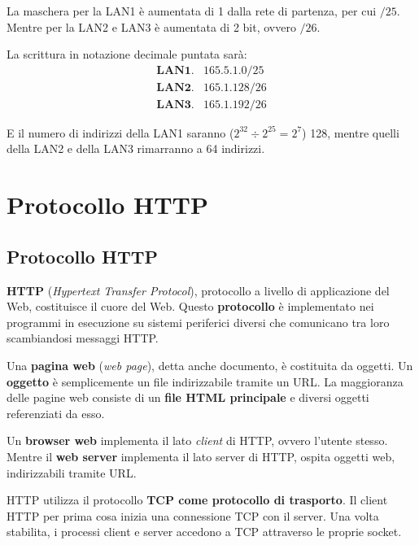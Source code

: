 \documentclass[a4paper]{article}
\begin{document}
	\noindent
	La maschera per la LAN1 è aumentata di 1 dalla rete di partenza, per cui $/25$. Mentre per la LAN2 e LAN3 è aumentata di 2 bit, ovvero $/26$.\newline
	
	\noindent
	La scrittura in notazione decimale puntata sarà:
	\begin{equation*}
		\begin{array}{ll}
			\textbf{LAN1.} & 165.5.1.0/25 \\
			\textbf{LAN2.} & 165.1.128/26 \\
			\textbf{LAN3.} & 165.1.192/26
		\end{array}
	\end{equation*}

	\noindent
	E il numero di indirizzi della LAN1 saranno ($2^{32} \div 2^{25} = 2^{7}$) 128, mentre quelli della LAN2 e della LAN3 rimarranno a 64 indirizzi.
	
	\newpage
	
	\section{Protocollo HTTP}
	
	\subsection{Protocollo HTTP}
	
	\textcolor{Red3}{\textbf{HTTP}} (\emph{Hypertext Transfer Protocol}), protocollo a livello di applicazione del Web, costituisce il cuore del Web. Questo \textbf{protocollo} è implementato nei programmi in esecuzione su sistemi periferici diversi che comunicano tra loro scambiandosi messaggi HTTP.\newline
	
	\noindent
	Una \textbf{pagina web} (\emph{web page}), detta anche documento, è costituita da oggetti. Un \textbf{oggetto} è semplicemente un file indirizzabile tramite un URL. La maggioranza delle pagine web consiste di un \textbf{file HTML principale} e diversi oggetti referenziati da esso.\newline
	
	\noindent
	Un \textbf{browser web} implementa il lato \emph{client} di HTTP, ovvero l’utente stesso. Mentre il \textbf{web server} implementa il lato server di HTTP, ospita oggetti web, indirizzabili tramite URL.\newline
	
	\noindent
	HTTP utilizza il protocollo \textbf{TCP come protocollo di trasporto}. Il client HTTP per prima cosa inizia una connessione TCP con il server. Una volta stabilita, i processi client e server accedono a TCP attraverso le proprie socket.\newline
	
\end{document}
